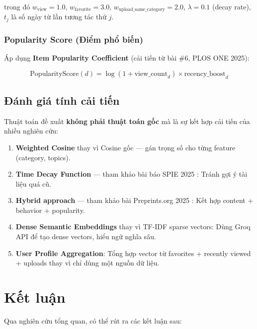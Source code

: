 \documentclass[12pt,a4paper]{article}
\begin{document}
trong đó $w_{\text{view}} = 1.0$, $w_{\text{favorite}} = 3.0$, $w_{\text{upload\_same\_category}} = 2.0$, $\lambda = 0.1$ (decay rate), $t_j$ là số ngày từ lần tương tác thứ $j$.

\subsubsection{Popularity Score (Điểm phổ biến)}

Áp dụng \textbf{Item Popularity Coefficient} (cải tiến từ bài \#6, PLOS ONE 2025):

\begin{equation}
\text{PopularityScore}(d) = \log(1 + \text{view\_count}_d) \times \text{recency\_boost}_d
\end{equation}

\subsection{Đánh giá tính cải tiến}

Thuật toán đề xuất \textbf{không phải thuật toán gốc} mà là sự kết hợp cải tiến của nhiều nghiên cứu:

\begin{enumerate}[noitemsep]
    \item \textbf{Weighted Cosine} thay vì Cosine gốc --- gán trọng số cho từng feature (category, topics).
    \item \textbf{Time Decay Function} --- tham khảo bài báo SPIE 2025 \cite{spie2025}: Tránh gợi ý tài liệu quá cũ.
    \item \textbf{Hybrid approach} --- tham khảo bài Preprints.org 2025 \cite{hybrid2025}: Kết hợp content + behavior + popularity.
    \item \textbf{Dense Semantic Embeddings} thay vì TF-IDF sparse vectors: Dùng Groq API để tạo dense vectors, hiểu ngữ nghĩa sâu.
    \item \textbf{User Profile Aggregation}: Tổng hợp vector từ favorites + recently viewed + uploads thay vì chỉ dùng một nguồn dữ liệu.
\end{enumerate}

\section{Kết luận}

Qua nghiên cứu tổng quan, có thể rút ra các kết luận sau:
\end{document}
